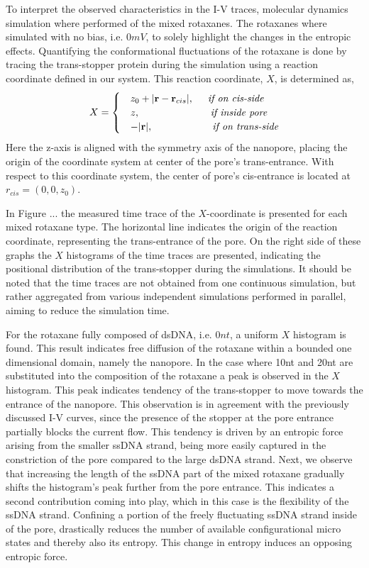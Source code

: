 To interpret the observed characteristics in the I-V traces, molecular dynamics
simulation where performed of the mixed rotaxanes. The rotaxanes where simulated with no
bias, i.e. $0 mV$, to solely highlight the changes in the entropic effects. Quantifying
the conformational fluctuations of the rotaxane is done by tracing the trans-stopper
protein during the simulation using a reaction coordinate defined in our system. This
reaction coordinate, $X$, is determined as,
\begin{equation}
  X = \begin{cases}
        &z_0 + |\textbf{r} - \textbf{r}_{cis}|, \hspace{0.5cm} \textit{if on cis-side}\\
        &z, \hspace{2.5cm} \textit{if inside pore}\\
        &-|\textbf{r}|, \hspace{2.11cm} \textit{if on trans-side}
      \end{cases}
\end{equation}
Here the z-axis is aligned with the symmetry axis of the nanopore, placing the origin of
the coordinate system at center of the pore's trans-entrance. With respect to this
coordinate system, the center of pore's cis-entrance is located at $r_{cis} = (0,0,z_0)$.

In Figure ... the measured time trace of the $X$-coordinate is presented for each mixed
rotaxane type.  The horizontal line indicates the origin of the reaction coordinate,
representing the trans-entrance of the pore. On the right side of these graphs the $X$
histograms of the time traces are presented, indicating the positional distribution of
the trans-stopper during the simulations. It should be noted that the time traces are not
obtained from one continuous simulation, but rather aggregated from various independent
simulations performed in parallel, aiming to reduce the simulation time.

For the rotaxane fully composed of dsDNA, i.e. $0nt$, a uniform  $X$  histogram is found.
This result indicates free diffusion of the rotaxane within a bounded one dimensional
domain, namely the nanopore. In the case where 10nt and 20nt are substituted into the
composition of the rotaxane a peak is observed in the $X$ histogram. This peak indicates
tendency of the trans-stopper to move towards the entrance of the nanopore. This
observation is in agreement with the previously discussed I-V curves, since the presence
of the stopper at the pore entrance partially blocks the current flow. This tendency
is driven by an entropic force arising from the smaller ssDNA strand, being more easily
captured in the constriction of the pore compared to the large dsDNA strand. Next, we
observe that increasing the length of the ssDNA part of the mixed rotaxane gradually
shifts the histogram's peak further from the pore entrance. This indicates a second
contribution coming into play, which in this case is the flexibility of the ssDNA strand.
Confining a portion of the freely fluctuating ssDNA strand inside of the pore,
drastically reduces the number of available configurational micro states and thereby also
its entropy. This change in entropy induces an opposing entropic force.


